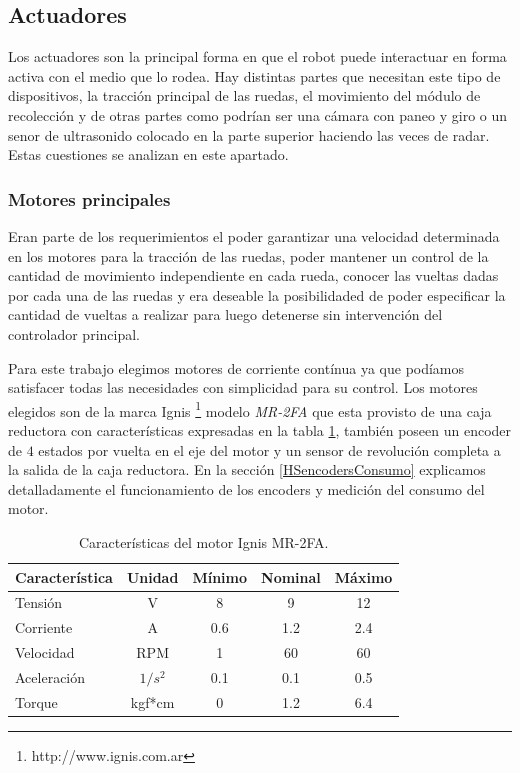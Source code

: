 \subsection{Actuadores}
\label{Hactuadores}

	Los actuadores son la principal forma en que el robot puede interactuar en forma activa con el medio que lo rodea. Hay distintas partes que necesitan
	este tipo de dispositivos, la tracci\'on principal de las ruedas, el movimiento del m\'odulo de recolecci\'on y de otras partes como podr\'ian ser una
	c\'amara con paneo y giro o un senor de ultrasonido colocado en la parte superior haciendo las veces de radar.
	Estas cuestiones se analizan en este apartado.

\subsubsection{Motores principales}
\label{HmotoresP}

	Eran parte de los requerimientos el poder garantizar una velocidad determinada en los motores para la tracci\'on de las ruedas, poder mantener
	un control de la cantidad de movimiento independiente en cada rueda, conocer las vueltas dadas por cada una de las ruedas y era deseable
	la posibilidaded de poder especificar la cantidad de vueltas a realizar para luego detenerse sin intervenci\'on del controlador principal.
	
	Para este trabajo elegimos motores de corriente cont\'inua ya que pod\'iamos satisfacer todas las necesidades con simplicidad para su control. Los motores
	elegidos son de la marca Ignis \footnote{http://www.ignis.com.ar} modelo \emph{MR-2FA} que esta provisto de una caja reductora con caracter\'isticas
	expresadas en la tabla \ref{HTmotorDC}, tambi\'en poseen un encoder de $4$ estados por vuelta en el eje del motor y un sensor de revoluci\'on completa a la salida de
	la caja reductora. En la secci\'on \ref{HSencodersConsumo} explicamos detalladamente el funcionamiento de los encoders y medici\'on del consumo del motor.
	
	\begin{table}
		\begin{center}
			\begin{tabular}{|l|c|c|c|c|}
				\hline
				Caracter\'istica & Unidad & M\'inimo & Nominal & M\'aximo \\
				\hline
				Tensi\'on & V & 8 & 9 & 12 \\
				Corriente & A & 0.6 & 1.2 & 2.4 \\
				Velocidad & RPM & 1 & 60 & 60 \\
				Aceleraci\'on & $1/s^{2}$ & 0.1 & 0.1 & 0.5 \\
				Torque & kgf*cm & 0 & 1.2 & 6.4 \\
				\hline
			\end{tabular}
		\end{center}
		\caption{Caracter\'isticas del motor Ignis MR-2FA.}
		\label{HTmotorDC}
	\end{table}
	

